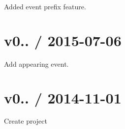 Added event prefix feature.

\section*{v0.. / 2015-\/07-\/06}

Add appearing event.

\section*{v0.. / 2014-\/11-\/01}

Create project 